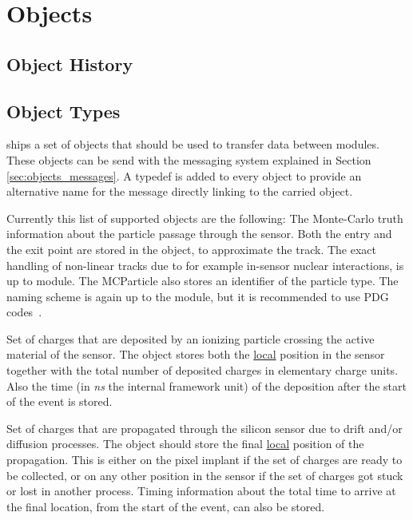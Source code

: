\section{Objects}
\label{sec:objects}

\subsection{Object History}
\label{sec:objhistory}


\subsection{Object Types}
\label{sec:objtypes}

\apsq ships a set of objects that should be used to transfer data between modules. These objects can be send with the messaging system explained in Section \ref{sec:objects_messages}. A typedef is added to every object to provide an alternative name for the message directly linking to the carried object.

Currently this list of supported objects are the following:
The Monte-Carlo truth information about the particle passage through the sensor. Both the entry and the exit point are stored in the object, to approximate the track. The exact handling of non-linear tracks due to for example in-sensor nuclear interactions, is up to module. The MCParticle also stores an identifier of the particle type. The naming scheme is again up to the module, but it is recommended to use PDG codes~\cite{pdg}.

Set of charges that are deposited by an ionizing particle crossing the active material of the sensor. The object stores both the \underline{local} position in the sensor together with the total number of deposited charges in elementary charge units. Also the time (in \textit{ns} the internal framework unit) of the deposition after the start of the event is stored.

Set of charges that are propagated through the silicon sensor due to drift and/or diffusion processes. The object should store the final \underline{local} position of the propagation. This is either on the pixel implant if the set of charges are ready to be collected, or on any other position in the sensor if the set of charges got stuck or lost in another process. Timing information about the total time to arrive at the final location, from the start of the event, can also be stored.

